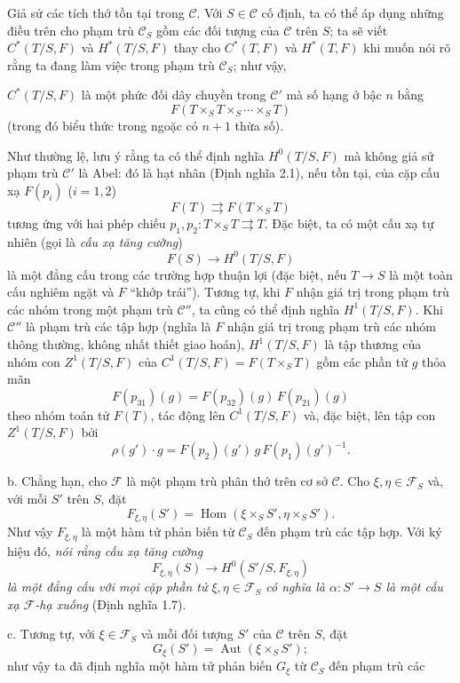 Giả sử các tích thớ tồn tại trong $\mathcal C$. Với $S\in\mathcal C$ cố định,
ta có thể áp dụng những điều trên cho phạm trù $\mathcal C_S$ gồm các đối tượng
của $\mathcal C$ trên $S$; ta sẽ viết $C^*(T/S,F)$ và $H^*(T/S,F)$ thay cho
$C^*(T,F)$ và $H^*(T,F)$ khi muốn nói rõ rằng ta đang làm việc trong phạm trù
$\mathcal C_S$; như vậy,

$C^*(T/S,F)$ là một phức đối dây chuyền trong $\mathcal C'$ mà số hạng ở bậc
$n$ bằng
\[
  F(T\times_ST\times_S\cdots\times_ST)
\]
(trong đó biểu thức trong ngoặc có $n+1$ thừa số).

Như thường lệ, lưu ý rằng ta có thể định nghĩa $H^0(T/S,F)$ mà không giả sử
phạm trù $\mathcal C'$ là Abel: đó là hạt nhân (Định nghĩa 2.1), nếu tồn tại,
của cặp cấu xạ $F(p_i)$ ($i=1,2$)
\[
  F(T)\rightrightarrows F(T\times_ST)
\]
tương ứng với hai phép chiếu
$p_1,p_2:T\times_ST\rightrightarrows T$. Đặc biệt, ta có một cấu xạ tự nhiên
(gọi là \emph{cấu xạ tăng cường})
\[
  F(S)\longrightarrow H^0(T/S,F)
\]
là một đẳng cấu trong các trường hợp thuận lợi (đặc biệt, nếu
$T\longrightarrow S$ là một toàn cấu nghiêm ngặt và $F$ “khớp trái”).
Tương tự, khi $F$ nhận giá trị trong phạm trù các nhóm trong một phạm trù
$\mathcal C''$, ta cũng có thể định nghĩa $H^1(T/S,F)$. Khi $\mathcal C''$ là
phạm trù các tập hợp (nghĩa là $F$ nhận giá trị trong phạm trù các nhóm thông
thường, không nhất thiết giao hoán), $H^1(T/S,F)$ là tập thương của nhóm con
$Z^1(T/S,F)$ của $C^1(T/S,F)=F(T\times_ST)$ gồm các phần tử $g$ thỏa mãn
\[
  F(p_{31})(g)=F(p_{32})(g)\,F(p_{21})(g)
\]
theo nhóm toán tử $F(T)$, tác động lên $C^1(T/S,F)$ và, đặc biệt, lên tập con
$Z^1(T/S,F)$ bởi
\[
  \rho(g')\cdot g=F(p_2)(g')\,g\,F(p_1)(g')^{-1}.
\]

\medskip\noindent
b. Chẳng hạn, cho $\mathcal F$ là một phạm trù phân thớ trên cơ sở
$\mathcal C$. Cho $\xi,\eta\in\mathcal F_S$ và, với mỗi $S'$ trên $S$, đặt
\[
  F_{\xi,\eta}(S')=
  \operatorname{Hom}(\xi\times_SS',\eta\times_SS').
\]
Như vậy $F_{\xi,\eta}$ là một hàm tử phản biến từ $\mathcal C_S$ đến phạm trù
các tập hợp. Với ký hiệu đó, \emph{nói rằng cấu xạ tăng cường}
\[
  F_{\xi,\eta}(S)\longrightarrow H^0(S'/S,F_{\xi,\eta})
\]
\emph{là một đẳng cấu với mọi cặp phần tử
$\xi,\eta\in\mathcal F_S$ có nghĩa là
$\alpha:S'\longrightarrow S$ là một cấu xạ $\mathcal F$-hạ xuống}
(Định nghĩa 1.7).

\medskip\noindent
c. Tương tự, với $\xi\in\mathcal F_S$ và mỗi đối tượng $S'$ của $\mathcal C$
trên $S$, đặt
\[
  G_\xi(S')=\operatorname{Aut}(\xi\times_SS') ;
\]
như vậy ta đã định nghĩa một hàm tử phản biến $G_\xi$ từ $\mathcal C_S$ đến
phạm trù các

